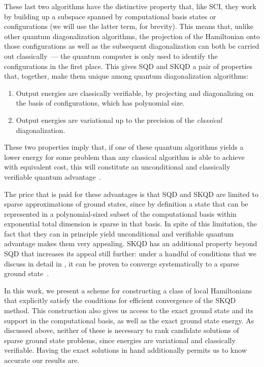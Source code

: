 \documentclass[
  reprint,            %
  amsmath,amssymb,
  aps,
  superscriptaddress, %
  longbibliography
]{revtex4-2}
\theoremstyle{definition}
\begin{document}
These last two algorithms have the distinctive property that, like SCI, they work by building up a subspace spanned by computational basis states or configurations (we will use the latter term, for brevity).
This means that, unlike other quantum diagonalization algorithms, the projection of the Hamiltonian onto those configurations as well as the subsequent diagonalization can both be carried out classically~--- the quantum computer is only used to identify the configurations in the first place.
This gives SQD and SKQD a pair of properties that, together, make them unique among quantum diagonalization algorithms:
\begin{enumerate}
    \item Output energies are classically verifiable, by projecting and diagonalizing on the basis of configurations, which has polynomial size.
    \item Output energies are variational up to the precision of the \emph{classical} diagonalization.
\end{enumerate}
These two properties imply that, if one of these quantum algorithms yields a lower energy for some problem than any classical algorithm is able to achieve with equivalent cost, this will constitute an unconditional and classically verifiable quantum advantage~\cite{lanes2025framework}.

The price that is paid for these advantages is that SQD and SKQD are limited to sparse approximations of ground states, since by definition a state that can be represented in a polynomial-sized subset of the computational basis within exponential total dimension is sparse in that basis.
In spite of this limitation, the fact that they can in principle yield unconditional and verifiable quantum advantage makes them very appealing.
SKQD has an additional property beyond SQD that increases its appeal still further: under a handful of conditions that we discuss in detail in , it can be proven to converge systematically to a sparse ground state~\cite{yu2025quantum}.

In this work, we present a scheme for constructing a class of local Hamiltonians that explicitly satisfy the conditions for efficient convergence of the SKQD method.
This construction also gives us access to the exact ground state and its support in the computational basis, as well as the exact ground state energy.
As discussed above, neither of these is necessary to rank candidate solutions of sparse ground state problems, since energies are variational and classically verifiable.
Having the exact solutions in hand additionally permits us to know accurate our results are.
\end{document}
